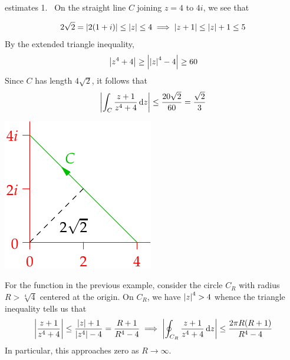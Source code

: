 \begin{examples}{}{estimates}
\hangindent\leftmargini
\textup{1.} \ On the straight line $C$ joining $z=4$ to $4i$, we see that\par
\begin{enumerate}\setcounter{enumi}{1}
\begin{minipage}[t]{0.65\linewidth}\vspace{-15pt}
  \item[]\[2\sqrt 2=\left| 2(1+i)\right|\le \left| z\right|\le 4 \implies \left| z+1\right|\le \left| z\right|+1\le 5\]
  By the extended triangle inequality,
  \[\left| z^4+4\right|\ge \left| \left| z\right|^4-4\right|\ge 60\]
  Since $C$ has length $4\sqrt 2$, it follows that
  \[\left| \int_C\frac{z+1}{z^4+4}\,{\mathrm{d} z}\right| \le\frac{20\sqrt 2}{60}=\frac{\sqrt 2}{3}\]
\end{minipage}\begin{minipage}[t]{0.35\linewidth}\vspace{-15pt}
\flushright\includegraphics{bound-ex1}
\end{minipage}

  \item For the function in the previous example, consider the circle $C_R$ with radius $R>\sqrt[4]{4}$ centered at the origin. On $C_R$, we have $\left| z\right|^4>4$ whence the triangle inequality tells us that
  \[\left| \frac{z+1}{z^4+4}\right|\le\frac{\left| z\right|+1}{\left| z^4\right|-4} =\frac{R+1}{R^4-4}\implies \left| \oint_{C_R}\frac{z+1}{z^4+4}\,{\mathrm{d} z}\right|\le \frac{2\pi R(R+1)}{R^4-4}\]
  In particular, this approaches zero as $R\to\infty$.
  

\end{enumerate}
\end{examples}
